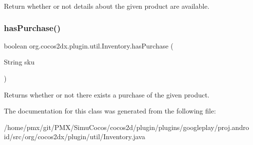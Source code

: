 Return whether or not details about the given product are available. \mbox{\label{classorg_1_1cocos2dx_1_1plugin_1_1util_1_1Inventory_ab3594605b252244f49c65238c930b3f5}} 
\subsubsection{\texorpdfstring{has\+Purchase()}{hasPurchase()}}
{\footnotesize\ttfamily boolean org.\+cocos2dx.\+plugin.\+util.\+Inventory.\+has\+Purchase (\begin{DoxyParamCaption}\item[{String}]{sku }\end{DoxyParamCaption})\hspace{0.3cm}{\ttfamily [inline]}}

Returns whether or not there exists a purchase of the given product. 

The documentation for this class was generated from the following file\+:\begin{DoxyCompactItemize}
\item 
/home/pmx/git/\+P\+M\+X/\+Simu\+Cocos/cocos2d/plugin/plugins/googleplay/proj.\+android/src/org/cocos2dx/plugin/util/Inventory.\+java\end{DoxyCompactItemize}

